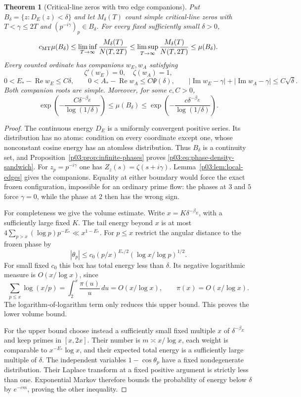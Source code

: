 \documentclass[11pt,letterpaper]{article}
\newtheorem{theorem}{Theorem}[section]
\theoremstyle{definition}
\theoremstyle{remark}
\renewcommand{\Re}{\operatorname{Re}}
\renewcommand{\Im}{\operatorname{Im}}
\newcommand{\1}{\mathbf 1}
\begin{document}
\begin{theorem}[Critical-line zeros with two edge companions]
\label{p03:thm:triples}
Put $B_\delta=\{z:D_E(z)<\delta\}$ and let $M_\delta(T)$ count
simple critical-line zeros with $T<\gamma\le2T$ and
$(p^{-i\gamma})_p\in B_\delta$. For every fixed sufficiently small
$\delta>0$,
\begin{equation}\label{p03:eq:phase-density-sandwich}
 c_{\rm MT}\mu(B_\delta)\le
 \liminf_{T\to\infty}\frac{M_\delta(T)}{N(T,2T)}
 \le\limsup_{T\to\infty}\frac{M_\delta(T)}{N(T,2T)}
 \le\mu(B_\delta).
\end{equation}
Every counted ordinate has companions $w_E,w_A$ satisfying
\[
 \zeta'(w_E)=0,\quad\zeta(w_A)=1,
\]
\[
 0<E_*-\Re w_E\le C\delta,\qquad
 0<A_*-\Re w_A\le C\Psi(\delta),\qquad
 |\Im w_E-\gamma|+|\Im w_A-\gamma|\le C\sqrt\delta.
\]
Both companion roots are simple. Moreover, for some $c,C>0$,
\begin{equation}\label{p03:eq:energy-entropy}
 \exp\!\left(-\frac{C\delta^{-\beta_E}}{\log(1/\delta)}\right)
 \le\mu(B_\delta)\le
 \exp\!\left(-\frac{c\delta^{-\beta_E}}{\log(1/\delta)}\right).
\end{equation}
\end{theorem}
\begin{proof}
The continuous energy $D_E$ is a uniformly convergent positive
series. Its distribution has no atoms: condition on every coordinate
except one, whose nonconstant cosine energy has an atomless
distribution. Thus $B_\delta$ is a continuity set, and
Proposition~\ref{p03:prop:infinite-phases} proves
\eqref{p03:eq:phase-density-sandwich}.
For $z_p=p^{-i\gamma}$ one has $Z_z(s)=\zeta(s+i\gamma)$.
Lemma~\ref{p03:lem:local-edges} gives the companions. Equality at either
boundary would force the exact frozen configuration, impossible
for an ordinary prime flow: the phases at $3$ and $5$ force
$\gamma=0$, while the phase at $2$ then has the wrong sign.

For completeness we give the volume estimate. Write
$x=K\delta^{-\beta_E}$, with a sufficiently large fixed $K$.
The tail energy beyond $x$ is at most
$4\sum_{p>x}(\log p)p^{-E_*}\ll x^{1-E_*}$.
For $p\le x$ restrict the angular distance to the frozen phase by
\[
 |\theta_p|\le c_0(p/x)^{E_*/2}
                  (\log x/\log p)^{1/2}.
\]
For small fixed $c_0$ this box has total energy less than $\delta$.
Its negative logarithmic measure is $O(x/\log x)$, since
\[
 \sum_{p\le x}\log(x/p)=\int_2^x\frac{\pi(u)}u\,du
 =O(x/\log x),\qquad \pi(x)=O(x/\log x).
\]
The logarithm-of-logarithm term only reduces this upper bound.
This proves the lower volume bound.

For the upper bound choose instead a sufficiently small fixed
multiple $x$ of $\delta^{-\beta_E}$ and keep primes in $[x,2x]$.
Their number is $m\asymp x/\log x$, each weight is comparable to
$x^{-E_*}\log x$, and their expected total energy is a sufficiently
large multiple of $\delta$. The independent variables
$1-\cos\theta_p$ have a fixed nondegenerate distribution.
Their Laplace transform at a fixed positive argument is strictly
less than one. Exponential Markov therefore bounds the probability
of energy below $\delta$ by $e^{-cm}$, proving the other inequality.
\end{proof}
\end{document}
